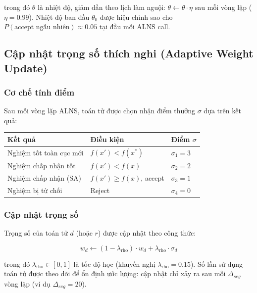 trong đó $\theta$ là nhiệt độ, giảm dần theo lịch làm nguội: $\theta \gets \theta \cdot \eta$ sau mỗi vòng lặp ($\eta = 0.99$). Nhiệt độ ban đầu $\theta_0$ được hiệu chỉnh sao cho $P(\text{accept ngẫu nhiên}) \approx 0.05$ tại đầu mỗi ALNS call.

\subsection{Cập nhật trọng số thích nghi (Adaptive Weight Update)}

\subsubsection*{Cơ chế tính điểm}

Sau mỗi vòng lặp ALNS, toán tử được chọn nhận điểm thưởng $\sigma$ dựa trên kết quả:

\begin{center}
\begin{tabular}{lll}
\toprule
\textbf{Kết quả} & \textbf{Điều kiện} & \textbf{Điểm $\sigma$} \\
\midrule
Nghiệm tốt toàn cục mới & $f(x') < f(x^*)$ & $\sigma_1 = 3$ \\
Nghiệm chấp nhận tốt & $f(x') < f(x)$ & $\sigma_2 = 2$ \\
Nghiệm chấp nhận (SA) & $f(x') \geq f(x)$, accept & $\sigma_3 = 1$ \\
Nghiệm bị từ chối & Reject & $\sigma_4 = 0$ \\
\bottomrule
\end{tabular}
\end{center}

\subsubsection*{Cập nhật trọng số}

Trọng số của toán tử $d$ (hoặc $r$) được cập nhật theo công thức:

\begin{equation}
  w_d \gets (1 - \lambda_{\text{rho}}) \cdot w_d + \lambda_{\text{rho}} \cdot \sigma_d
  \label{eq:weight_update}
\end{equation}

trong đó $\lambda_{\text{rho}} \in [0,1]$ là tốc độ học (khuyến nghị $\lambda_{\text{rho}} = 0.15$). Số lần sử dụng toán tử được theo dõi để ổn định ước lượng: cập nhật chỉ xảy ra sau mỗi $\Delta_{seg}$ vòng lặp (ví dụ $\Delta_{seg} = 20$).

